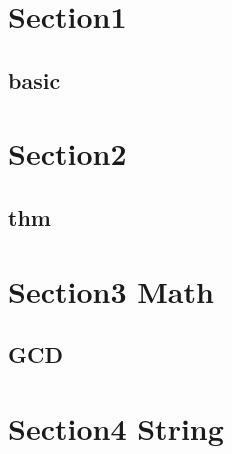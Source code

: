 \section{Section1}
    \subsection{basic}
        

\section{Section2}
    \subsection{thm}
        
        
\section{Section3 Math}
    \subsection{GCD}
        
\section{Section4 String}